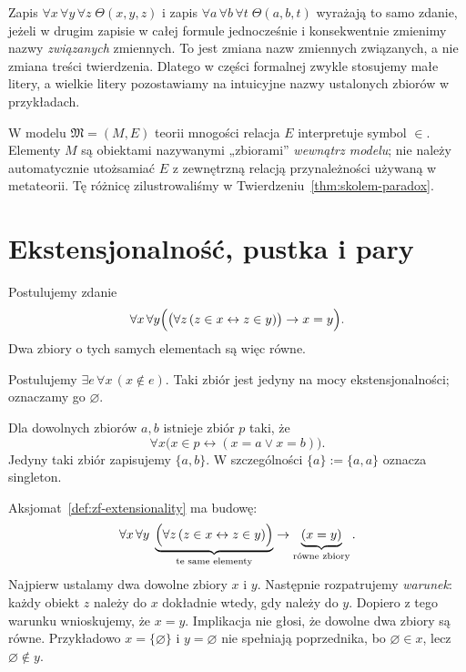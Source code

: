 \begin{przyklad}
Zapis $\forall x\,\forall y\,\forall z\;\Theta(x,y,z)$
i zapis $\forall a\,\forall b\,\forall t\;\Theta(a,b,t)$
wyrażają to samo zdanie, jeżeli w drugim zapisie
w całej formule jednocześnie i konsekwentnie zmienimy
nazwy \emph{związanych} zmiennych. To jest zmiana nazw
zmiennych związanych, a nie zmiana treści twierdzenia.
Dlatego w części formalnej zwykle stosujemy małe litery,
a wielkie litery pozostawiamy na intuicyjne nazwy
ustalonych zbiorów w przykładach.
\end{przyklad}

\begin{uwaga}
W modelu $\mathfrak M=(M,E)$ teorii mnogości relacja $E$ interpretuje
symbol $\in$. Elementy $M$ są obiektami nazywanymi „zbiorami”
\emph{wewnątrz modelu}; nie należy automatycznie utożsamiać $E$
z zewnętrzną relacją przynależności używaną w metateorii.
Tę różnicę zilustrowaliśmy w Twierdzeniu~\ref{thm:skolem-paradox}.
\end{uwaga}

\section{Ekstensjonalność, pustka i pary}
\begin{definicja}\label{def:zf-extensionality}
Postulujemy zdanie
\[
\forall x\,\forall y\Bigl(\bigl(\forall z\,(z\in x\leftrightarrow z\in y)\bigr)
\to x=y\Bigr).
\]
Dwa zbiory o tych samych elementach są więc równe.
\end{definicja}

\begin{definicja}\label{def:zf-empty}
Postulujemy $\exists e\,\forall x\,(x\notin e)$.
Taki zbiór jest jedyny na mocy ekstensjonalności;
oznaczamy go $\varnothing$.
\end{definicja}

\begin{definicja}\label{def:zf-pairing}
Dla dowolnych zbiorów $a,b$ istnieje zbiór $p$ taki, że
\[
\forall x\bigl(x\in p\leftrightarrow(x=a\lor x=b)\bigr).
\]
Jedyny taki zbiór zapisujemy $\{a,b\}$. W szczególności
$\{a\}:=\{a,a\}$ oznacza singleton.
\end{definicja}


\begin{przyklad}
Aksjomat~\ref{def:zf-extensionality} ma budowę:
\[
\forall x\,\forall y\;
\underbrace{\Bigl(\forall z\,(z\in x\leftrightarrow z\in y)\Bigr)}_{\text{te same elementy}}
\to\underbrace{(x=y)}_{\text{równe zbiory}}.
\]
Najpierw ustalamy dwa dowolne zbiory $x$ i $y$.
Następnie rozpatrujemy \emph{warunek}: każdy obiekt $z$
należy do $x$ dokładnie wtedy, gdy należy do $y$.
Dopiero z tego warunku wnioskujemy, że $x=y$.
Implikacja nie głosi, że dowolne dwa zbiory są równe.
Przykładowo $x=\{\varnothing\}$ i $y=\varnothing$
nie spełniają poprzednika, bo $\varnothing\in x$, lecz
$\varnothing\notin y$.
\end{przyklad}


